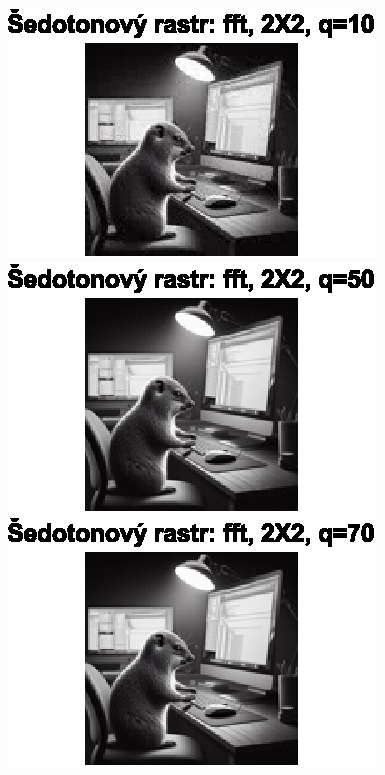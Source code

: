 \begin{figure}[H]
    \centering
    \begin{minipage}[b]{0.3\textwidth}
        \centering
        \includegraphics[width=\textwidth]{images/sedo_fft_2X2_q10.eps}
    \end{minipage}
    \hfill
    \begin{minipage}[b]{0.3\textwidth}
        \centering
        \includegraphics[width=\textwidth]{images/sedo_fft_2X2_q50.eps}
    \end{minipage}
    \hfill
    \begin{minipage}[b]{0.3\textwidth}
        \centering
        \includegraphics[width=\textwidth]{images/sedo_fft_2X2_q70.eps}

\end{minipage}
\end{figure}
